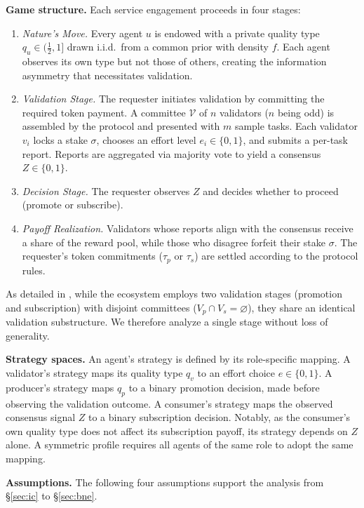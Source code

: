 \noindent\textbf{Game structure.}
Each service engagement proceeds in four stages:
\begin{enumerate}[leftmargin=2em]
    \item \textit{Nature's Move.} Every agent $u$ is endowed with a private quality type $q_u \in (\tfrac{1}{2}, 1]$ drawn i.i.d.\ from a common prior with density $f$. Each agent observes its own type but not those of others, creating the information asymmetry that necessitates validation.
    \item \textit{Validation Stage.} The requester initiates validation by committing the required token payment. A committee $\mathcal{V}$ of $n$ validators ($n$ being odd) is assembled by the protocol and presented with $m$ sample tasks. Each validator $v_i$ locks a stake $\sigma$, chooses an effort level $e_i \in \{0, 1\}$, and submits a per-task report. Reports are aggregated via majority vote to yield a consensus $Z\in \{0, 1\}$.
    \item \textit{Decision Stage.} The requester observes $Z$ and decides whether to proceed (promote or subscribe).
    \item \textit{Payoff Realization.} Validators whose reports align with the consensus receive a share of the reward pool, while those who disagree forfeit their stake $\sigma$. The requester's token commitments ($\tau_p$ or $\tau_s$) are settled according to the protocol rules.
\end{enumerate}
\noindent As detailed in , while the ecosystem employs two validation stages (promotion and subscription) with disjoint committees ($V_p \cap V_s = \varnothing$), they share an identical validation substructure. We therefore analyze a single stage without loss of generality.

\noindent\textbf{Strategy spaces.}
An agent's strategy is defined by its role-specific mapping. A validator's strategy maps its quality type $q_v$ to an effort choice $e \in \{0, 1\}$. A producer's strategy maps $q_p$ to a binary promotion decision, made before observing the validation outcome. A consumer's strategy maps the observed consensus signal $Z$ to a binary subscription decision. Notably, as the consumer's own quality type does not affect its subscription payoff, its strategy depends on $Z$ alone. A symmetric profile requires all agents of the same role to adopt the same mapping.

\noindent\textbf{Assumptions.}
The following four assumptions support the analysis from \S\ref{sec:ic} to \S\ref{sec:bne}.

